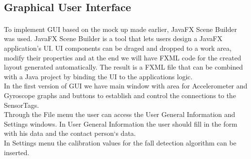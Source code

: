 \documentclass[hidelinks,conference,12pt]{IEEETran}
\begin{document}
\subsection{Graphical User Interface} 
To implement GUI based on the mock up made earlier, JavaFX Scene Builder\textsuperscript{\cite{JavaFX}} was used. JavaFX Scene Builder is a tool that lets users design a JavaFX application’s UI. UI components can be
draged and dropped to a work area, modify their properties and at the end we will have FXML code
for the created layout generated automatically. The result is a FXML file that can be combined with a Java project by binding the UI to the applications logic.\\
In the first version of GUI we have main window with area for Accelerometer and Gyroscope graphs
and buttons to establish and control the connections to the SensorTags.\\
Through the File menu the user can access the User General Information and Settings windows.
In User General Information the user should fill in the form with his data and the contact person‘s data.\\
In Settings menu the calibration values for the fall detection algorithm can be inserted.
\end{document}
